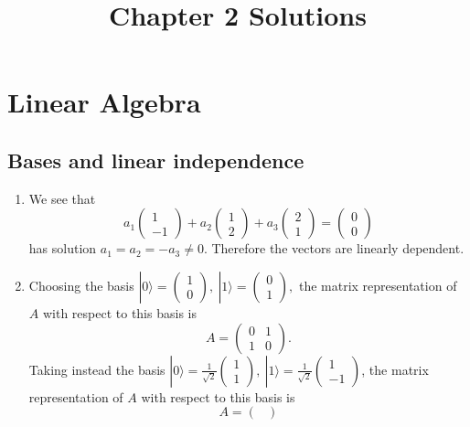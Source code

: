 \documentclass[12 pt]{article}
\begin{document}
\title{Chapter 2 Solutions}
\author{}
\date{}
\maketitle
\section{Linear Algebra}
\subsection{Bases and linear independence}
\begin{enumerate}
\item We see that 
$$a_1\begin{pmatrix}
	1\\-1
\end{pmatrix}+a_2\begin{pmatrix}
	1\\2
\end{pmatrix}+a_3\begin{pmatrix}
	2\\1
\end{pmatrix}=\begin{pmatrix}
	0\\0
\end{pmatrix}$$
has solution $a_1=a_2=-a_3 \neq 0$. Therefore the vectors are linearly dependent.
\item Choosing the basis $|0\rangle =\begin{pmatrix}
	1\\0
\end{pmatrix}, \ |1\rangle =\begin{pmatrix}
	0\\1
\end{pmatrix},$ the matrix representation of $A$ with respect to this basis is 
$$A=\begin{pmatrix}
	0&1\\1&0
\end{pmatrix}.$$
Taking instead the basis $|0\rangle=\frac{1}{\sqrt{2}}\begin{pmatrix}
	1\\1
\end{pmatrix}, \ |1\rangle=\frac{1}{\sqrt{2}}\begin{pmatrix}
	1\\-1
\end{pmatrix}$, the matrix representation of $A$ with respect to this basis is
$$A=\begin{pmatrix}

\end{pmatrix}$$
\end{enumerate}
\end{document}
